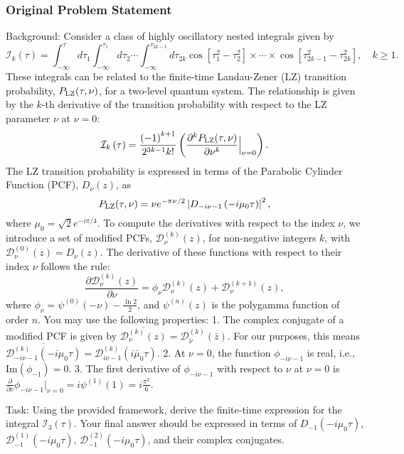\documentclass[10pt]{article}
\begin{document}
\subsubsection*{Original Problem Statement}
Background:
Consider a class of highly oscillatory nested integrals given by
$$ \mathcal{I}_{k}(\tau)=\int^\tau_{-\infty}d\tau_{1}\int^{\tau_{1}}_{-\infty}d\tau_{2} \cdots\int^{\tau_{2k-1}}_{-\infty}d\tau_{2k}\cos[\tau^{2}_{1}-\tau^{2}_{2}]\times\cdots\times\cos[ \tau^{2}_{2k-1}-\tau^{2}_{2k}], \quad k\ge 1. $$
These integrals can be related to the finite-time Landau-Zener (LZ) transition probability, $P_{\rm LZ}(\tau,\nu)$, for a two-level quantum system. The relationship is given by the $k$-th derivative of the transition probability with respect to the LZ parameter $\nu$ at $\nu=0$:
$$ \mathcal{I}_{k}\left(\tau\right)=\frac{\left(-1\right)^{k+1}}{2^{3k-1}k!}\left(\frac{\partial^{k}P_{\rm LZ}(\tau,\nu)}{\partial \nu^{k}}\Big|_{\nu=0}\right). $$
The LZ transition probability is expressed in terms of the Parabolic Cylinder Function (PCF), $D_{\nu}(z)$, as
$$ P_{\rm LZ}(\tau,\nu)=\nu e^{-\pi\nu/2}\left|D_{-i\nu-1}\left(-i\mu_0\tau\right)\right|^{2}, $$
where $\mu_0=\sqrt{2}e^{-i\pi/4}$. To compute the derivatives with respect to the index $\nu$, we introduce a set of modified PCFs, $\mathcal{D}^{\left(k\right)}_{\nu}\left(z\right)$, for non-negative integers $k$, with $\mathcal{D}^{\left(0\right)}_{\nu}\left(z\right) = D_{\nu}\left(z\right)$. The derivative of these functions with respect to their index $\nu$ follows the rule:
$$ \frac{\partial \mathcal{D}^{\left(k\right)}_{\nu}\left(z\right)}{\partial \nu}=\phi_{\nu}\mathcal{D}^{\left(k\right)}_{\nu}\left(z\right)+\mathcal{D}^{\left(k+1\right)}_{\nu}\left(z\right), $$
where $\phi_{\nu}=\psi^{\left(0\right)}\left(-\nu\right)-\frac{\ln 2}{2}$, and $\psi^{(n)}(z)$ is the polygamma function of order $n$. You may use the following properties:
1. The complex conjugate of a modified PCF is given by $\overline{\mathcal{D}^{(k)}_{\nu}(z)} = \mathcal{D}^{(k)}_{\bar{\nu}}(\bar{z})$. For our purposes, this means $\overline{\mathcal{D}^{(k)}_{-i\nu-1}(-i\mu_0\tau)} = \mathcal{D}^{(k)}_{i\nu-1}(i\bar{\mu}_0\tau)$.
2. At $\nu=0$, the function $\phi_{-i\nu-1}$ is real, i.e., $\mathrm{Im}(\phi_{-1})=0$.
3. The first derivative of $\phi_{-i\nu-1}$ with respect to $\nu$ at $\nu=0$ is $\frac{\partial}{\partial\nu}\phi_{-i\nu-1}\Big|_{\nu=0} = i\psi^{(1)}(1) = i\frac{\pi^2}{6}$.

Task:
Using the provided framework, derive the finite-time expression for the integral $\mathcal{I}_3(\tau)$. Your final answer should be expressed in terms of $D_{-1}(-i\mu_0\tau)$, $\mathcal{D}^{(1)}_{-1}(-i\mu_0\tau)$, $\mathcal{D}^{(2)}_{-1}(-i\mu_0\tau)$, and their complex conjugates.
\end{document}

